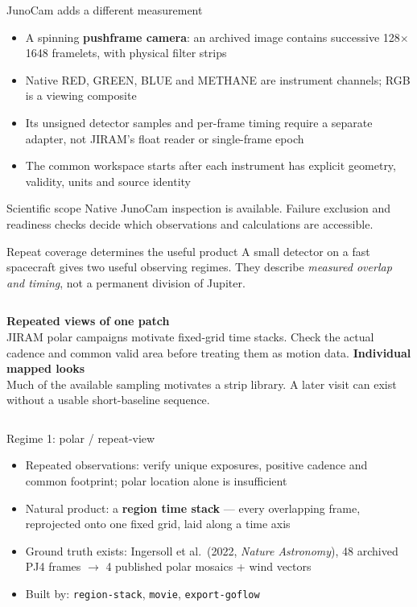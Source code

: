 \documentclass[aspectratio=169,11pt]{beamer}
\newcommand{\currevsec}{}
\newcommand{\revsec}[1]{\gdef\currevsec{#1}}
\begin{document}
\begin{frame}{JunoCam adds a different measurement}
  \revsec{1}
\begin{itemize}
    \item A spinning \textbf{pushframe camera}: an archived image contains successive 128$\times$1648 framelets, with physical filter strips
    \item Native RED, GREEN, BLUE and METHANE are instrument channels; RGB is a viewing composite
    \item Its unsigned detector samples and per-frame timing require a separate adapter, not JIRAM's float reader or single-frame epoch
    \item The common workspace starts after each instrument has explicit geometry, validity, units and source identity
  \end{itemize}
  \begin{block}{Scientific scope}
    Native JunoCam inspection is available. Failure exclusion and readiness checks decide which observations and calculations are accessible.
  \end{block}
\end{frame}

\begin{frame}{Repeat coverage determines the useful product}
  \revsec{1}
A small detector on a fast spacecraft gives two useful observing regimes. They describe \emph{measured overlap and timing}, not a permanent division of Jupiter.
  \vspace{0.4cm}
  \begin{columns}[T]
    \textbf{Repeated views of one patch}\\
    \small JIRAM polar campaigns motivate fixed-grid time stacks. Check the actual cadence and common valid area before treating them as motion data.
    \textbf{Individual mapped looks}\\
    \small Much of the available sampling motivates a strip library. A later visit can exist without a usable short-baseline sequence.
  \end{columns}
\end{frame}

\begin{frame}{Regime 1: polar / repeat-view}
  \revsec{1}
  \begin{itemize}
    \item Repeated observations: verify unique exposures, positive cadence and common footprint; polar location alone is insufficient
    \item Natural product: a \textbf{region time stack} --- every overlapping frame, reprojected onto one fixed grid, laid along a time axis
    \item Ground truth exists: Ingersoll et al.\ (2022, \emph{Nature Astronomy}), 48 archived PJ4 frames $\to$ 4 published polar mosaics + wind vectors
    \item Built by: \texttt{region-stack}, \texttt{movie}, \texttt{export-goflow}
  \end{itemize}
\end{frame}
\end{document}
